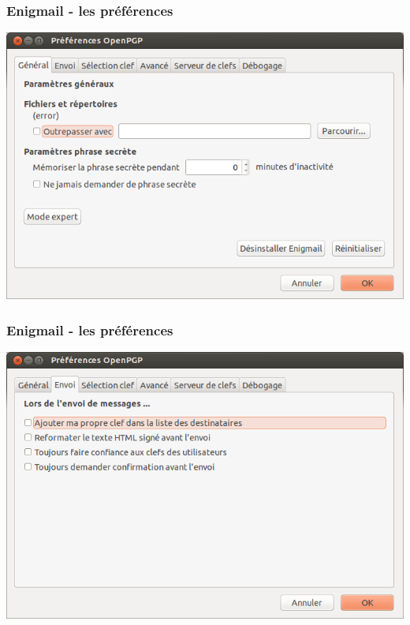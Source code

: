 \documentclass{beamer}
\begin{document}
\begin{frame}
\frametitle{Enigmail - les préférences}
\begin{center}
\includegraphics[scale=0.3] {./images/Enigmail02.png}
\end{center}
\end{frame}

\begin{frame}
\frametitle{Enigmail - les préférences}
\begin{center}
\includegraphics[scale=0.3] {./images/Enigmail03.png}
\end{center}
\end{frame}
\end{document}
